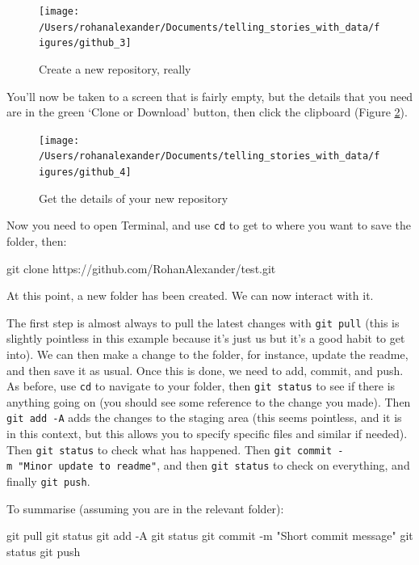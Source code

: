 \documentclass[
]{book}
\newenvironment{Shaded}{\begin{snugshade}}{\end{snugshade}}
\newcommand{\FunctionTok}[1]{\textcolor[rgb]{0.00,0.00,0.00}{#1}}
\newcommand{\NormalTok}[1]{#1}
\newcommand{\StringTok}[1]{\textcolor[rgb]{0.31,0.60,0.02}{#1}}
\begin{document}
\begin{figure}
\texttt{[image: /Users/rohanalexander/Documents/telling\_stories\_with\_data/figures/github\_3]} \caption{Create a new repository, really}\label{fig:githubthree}
\end{figure}

You'll now be taken to a screen that is fairly empty, but the details that you need are in the green `Clone or Download' button, then click the clipboard (Figure \ref{fig:githubfour}).

\begin{figure}
\texttt{[image: /Users/rohanalexander/Documents/telling\_stories\_with\_data/figures/github\_4]} \caption{Get the details of your new repository}\label{fig:githubfour}
\end{figure}

Now you need to open Terminal, and use \texttt{cd} to get to where you want to save the folder, then:

\begin{Shaded}
\begin{Highlighting}[]
\FunctionTok{git}\NormalTok{ clone https://github.com/RohanAlexander/test.git}
\end{Highlighting}
\end{Shaded}

At this point, a new folder has been created. We can now interact with it.

The first step is almost always to pull the latest changes with \texttt{git\ pull} (this is slightly pointless in this example because it's just us but it's a good habit to get into). We can then make a change to the folder, for instance, update the readme, and then save it as usual. Once this is done, we need to add, commit, and push. As before, use \texttt{cd} to navigate to your folder, then \texttt{git\ status} to see if there is anything going on (you should see some reference to the change you made). Then \texttt{git\ add\ -A} adds the changes to the staging area (this seems pointless, and it is in this context, but this allows you to specify specific files and similar if needed). Then \texttt{git\ status} to check what has happened. Then \texttt{git\ commit\ -m\ "Minor\ update\ to\ readme"}, and then \texttt{git\ status} to check on everything, and finally \texttt{git\ push}.

To summarise (assuming you are in the relevant folder):

\begin{Shaded}
\begin{Highlighting}[]
\FunctionTok{git}\NormalTok{ pull}
\FunctionTok{git}\NormalTok{ status}
\FunctionTok{git}\NormalTok{ add -A}
\FunctionTok{git}\NormalTok{ status}
\FunctionTok{git}\NormalTok{ commit -m }\StringTok{"Short commit message"}
\FunctionTok{git}\NormalTok{ status}
\FunctionTok{git}\NormalTok{ push}
\end{Highlighting}
\end{Shaded}
\end{document}
